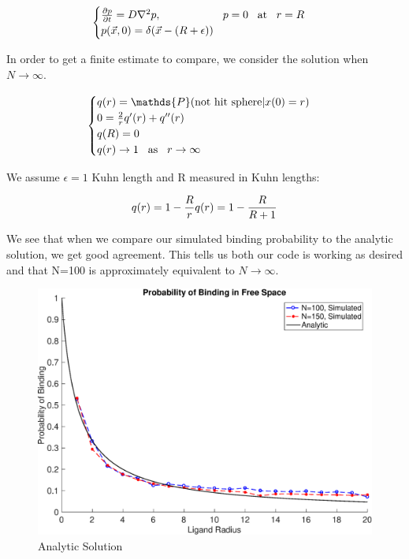 \documentclass[../AdvancementSummary.tex]{subfiles}
\begin{document}
\begin{equation}\label{eq: diffusion}
	\begin{cases}
		\frac{\partial p}{\partial t} = D \nabla^2 p, \hspace{2cm} p=0 \hspace{3mm}\text{at}\hspace{3mm} r=R\\
		p(\vec{x},0) = \delta(\vec{x}-(R+\epsilon))\\
	\end{cases}
\end{equation}

In order to get a finite estimate to compare, we consider the solution when $N\rightarrow \infty$.

 \begin{equation}\label{eq: analytic}
  	\begin{cases}
 	q(r)=\mathds{P}(\text{not hit sphere}|x(0)=r) \\
 	0=\frac{2}{r}q'(r)+q''(r) \\
 	q(R) = 0 \\
 	q(r) \rightarrow 1 \hspace{3mm}\text{as}\hspace{3mm} r \rightarrow \infty \\
 	\end{cases}
 \end{equation}

 We assume $\epsilon = 1$ Kuhn length and R measured in Kuhn lengths:

 \begin{equation}\label{eq: analyticSolution}
q(r) = 1-\frac{R}{r}\\
q(r) = 1-\frac{R}{R+1} \\
 \end{equation}
 
 We see that when we compare our simulated binding probability to the analytic solution, we get good agreement. This tells us both our code is working as desired and that N=100 is approximately equivalent to $N \rightarrow \infty$.

 \begin{figure}[H]
 \begin{center}
 \includegraphics[width=0.7\linewidth]{ModelConfirmationFigures/BindingVSAnalyticN100N150.eps}
 \end{center}
  \caption{Analytic Solution \label{fig: AnalyticBinding}}
 \end{figure}
\end{document}
